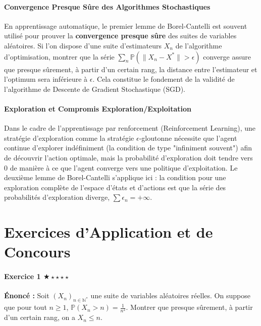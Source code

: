 \documentclass[11pt,a4paper]{article}
\begin{document}
\subsection{Convergence Presque Sûre des Algorithmes Stochastiques}
En apprentissage automatique, le premier lemme de Borel-Cantelli est souvent utilisé pour prouver la \textbf{convergence presque sûre} des suites de variables aléatoires. Si l'on dispose d'une suite d'estimateurs $X_n$ de l'algorithme d'optimisation, montrer que la série $\sum_{n} \mathbb{P}(\|X_n - X^*\| > \epsilon)$ converge assure que presque sûrement, à partir d'un certain rang, la distance entre l'estimateur et l'optimum sera inférieure à $\epsilon$. Cela constitue le fondement de la validité de l'algorithme de Descente de Gradient Stochastique (SGD).

\subsection{Exploration et Compromis Exploration/Exploitation}
Dans le cadre de l'apprentissage par renforcement (Reinforcement Learning), une stratégie d'exploration comme la stratégie $\epsilon$-gloutonne nécessite que l'agent continue d'explorer indéfiniment (la condition de type "infiniment souvent") afin de découvrir l'action optimale, mais la probabilité d'exploration doit tendre vers $0$ de manière à ce que l'agent converge vers une politique d'exploitation. Le deuxième lemme de Borel-Cantelli s'applique ici : la condition pour une exploration complète de l'espace d'états et d'actions est que la série des probabilités d'exploration diverge, $\sum \epsilon_n = +\infty$.


\newpage
\part{Exercices d'Application et de Concours}

\subsection*{Exercice 1 \quad $\bigstar\star\star\star\star$}


\textbf{Énoncé :}
Soit $(X_n)_{n \in \mathbb{N}^*}$ une suite de variables aléatoires réelles. On suppose que pour tout $n \ge 1$, $\mathbb{P}(X_n > n) = \frac{1}{n^2}$.
Montrer que presque sûrement, à partir d'un certain rang, on a $X_n \le n$.
\end{document}
